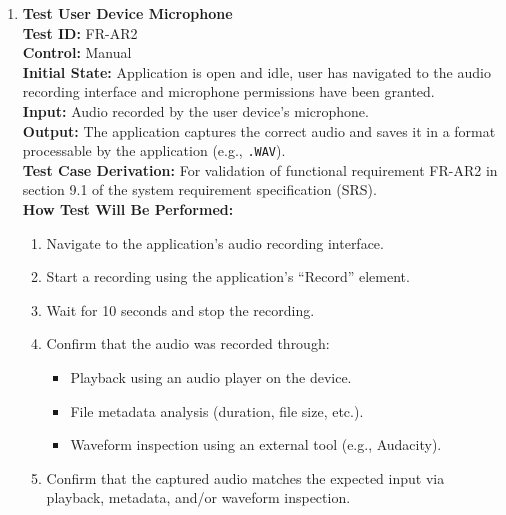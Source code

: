 \documentclass[12pt, titlepage]{article}
\begin{document}
\begin{enumerate}
  \item \textbf{Test User Device Microphone} \\
  \newline
  \textbf{Test ID:} FR-AR2 \\
  \textbf{Control:} Manual \\
  \textbf{Initial State:} Application is open and idle, user has navigated to the audio recording interface and microphone permissions have been granted. \\
  \textbf{Input:} Audio recorded by the user device’s microphone. \\
  \textbf{Output:} The application captures the correct audio and saves it in a format processable by the application (e.g., \texttt{.WAV}). \\
  \textbf{Test Case Derivation:} For validation of functional requirement FR-AR2 in section 9.1 of the system requirement specification (SRS). \\
  \textbf{How Test Will Be Performed:}
  \begin{enumerate}
      \item Navigate to the application’s audio recording interface.
      \item Start a recording using the application’s “Record” element.
      \item Wait for 10 seconds and stop the recording.
      \item Confirm that the audio was recorded through:
      \begin{itemize}
          \item Playback using an audio player on the device.
          \item File metadata analysis (duration, file size, etc.).
          \item Waveform inspection using an external tool (e.g., Audacity).
      \end{itemize}
      \item Confirm that the captured audio matches the expected input via playback, metadata, and/or waveform inspection.
  \end{enumerate}
  

\end{enumerate}
\end{document}
